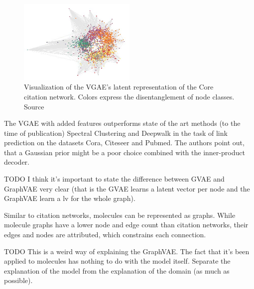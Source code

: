 \begin{figure}[h]
    \centering
    \includegraphics[width=0.5\textwidth]{data/images/KipGVAE.jpg}
    \caption{Visualization of the VGAE's latent representation of the Core citation network. Colors express the disentanglement of node classes. Source \cite{kipf_variational_2016}}
    \label{fig:kipfGVAE}
\end{figure}

The VGAE with added features outperforms state of the art methods (to the time of publication) Spectral Clustering \cite{tang2011leveraging} and Deepwalk \cite{perozzi2014deepwalk} in the task of link prediction on the datasets Cora, Citeseer and Pubmed. The authors point out, that a Gaussian prior might be a poor choice combined with the inner-product decoder.


TODO I think it's important to state the difference between GVAE and GraphVAE very clear (that is the GVAE learns a latent vector per node and the GraphVAE learn a lv for the whole graph).


Similar to citation networks, molecules can be represented as graphs. While molecule graphs have a lower node and edge count than citation networks, their edges and nodes are attributed, which  constrains each connection.


TODO This is a weird way of explaining the GraphVAE. The fact that it's been applied to molecules has nothing to do with the model itself. Separate the explanation of the model from the explanation of the domain (as much as possible).



